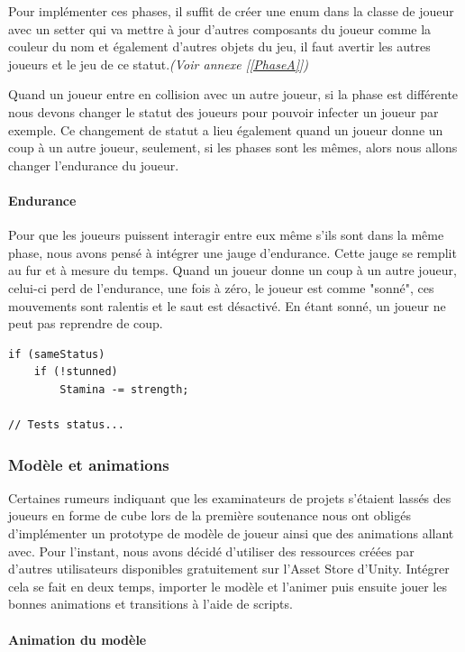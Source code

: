 \documentclass{article}
\begin{document}
Pour implémenter ces phases, il suffit de créer une enum dans la classe de joueur avec un setter qui va mettre à jour d'autres composants du joueur comme la couleur du nom et également d'autres objets du jeu, il faut avertir les autres joueurs et le jeu de ce statut.\emph{(Voir annexe [\ref{PhaseA}])}

Quand un joueur entre en collision avec un autre joueur, si la phase est différente nous devons changer le statut des joueurs pour pouvoir infecter un joueur par exemple. Ce changement de statut a lieu également quand un joueur donne un coup à un autre joueur, seulement, si les phases sont les mêmes, alors nous allons changer l'endurance du joueur.

\paragraph{Endurance}

Pour que les joueurs puissent interagir entre eux même s'ils sont dans la même phase, nous avons pensé à intégrer une jauge d'endurance. Cette jauge se remplit au fur et à mesure du temps. Quand un joueur donne un coup à un autre joueur, celui-ci perd de l'endurance, une fois à zéro, le joueur est comme "sonné", ces mouvements sont ralentis et le saut est désactivé. En étant sonné, un joueur ne peut pas reprendre de coup.

\begin{lstlisting}
if (sameStatus)
    if (!stunned)
        Stamina -= strength;

// Tests status...
\end{lstlisting}

\newpage
\subsubsection{Modèle et animations}
Certaines rumeurs indiquant que les examinateurs de projets s'étaient lassés des joueurs en forme de cube lors de la première soutenance nous ont obligés d'implémenter un prototype de modèle de joueur ainsi que des animations allant avec. Pour l'instant, nous avons décidé d'utiliser des ressources créées par d'autres utilisateurs disponibles gratuitement sur l'Asset Store d'Unity. Intégrer cela se fait en deux temps, importer le modèle et l'animer puis ensuite jouer les bonnes animations et transitions à l'aide de scripts.
\paragraph{Animation du modèle}
\end{document}
